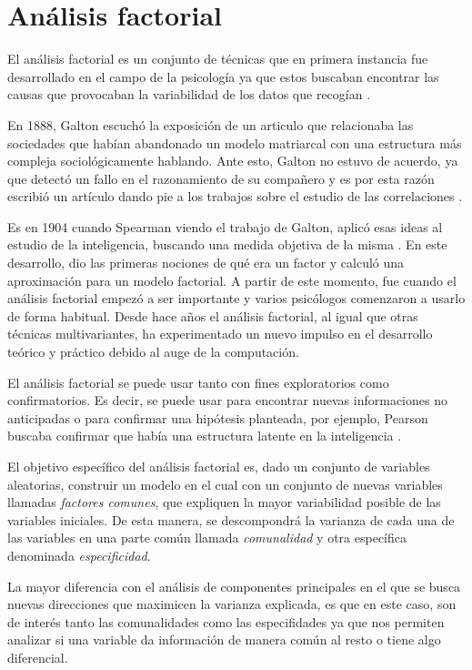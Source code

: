 \newpage
\section{Análisis factorial}

\noindent El análisis factorial es un conjunto de técnicas que en primera instancia fue desarrollado en el campo de la psicología ya que estos buscaban encontrar las causas que provocaban la variabilidad de los datos que recogían \cite{Vincent 1953}. 

\noindent En 1888, Galton escuchó la exposición de un articulo que relacionaba las sociedades que habían abandonado un modelo matriarcal con una estructura más compleja sociológicamente hablando. Ante esto, Galton no estuvo de acuerdo, ya que detectó un fallo en el razonamiento de su compañero y es por esta razón escribió un artículo  dando pie a los trabajos sobre el estudio de las correlaciones \cite{Galton 1889}.   

\noindent Es en 1904 cuando Spearman  viendo el trabajo de Galton, aplicó esas ideas al estudio de la inteligencia, buscando una medida objetiva de la misma \cite{Spearman 1904}. En este desarrollo, dio las primeras nociones de qué era un factor y calculó una aproximación para un modelo factorial. A partir de este momento, fue cuando el análisis factorial empezó a ser importante y varios psicólogos comenzaron a usarlo de forma habitual. 
Desde hace años el análisis factorial, al igual que otras técnicas multivariantes, ha experimentado un nuevo impulso en el desarrollo teórico y práctico debido al auge de la computación. 

\noindent El análisis factorial se puede usar tanto con fines exploratorios como confirmatorios. Es decir, se puede usar para encontrar nuevas informaciones no anticipadas o para confirmar una hipótesis planteada, por ejemplo, Pearson buscaba confirmar que había una estructura latente en la inteligencia \cite{Hair 1995}.

\noindent El objetivo específico del análisis factorial es, dado un conjunto de variables aleatorias, construir un modelo en el cual con un conjunto de nuevas variables llamadas \emph{factores comunes}, que expliquen la mayor variabilidad posible de las variables iniciales. De esta manera, se descompondrá la varianza de cada una de las variables en una parte común llamada \emph{comunalidad}  y otra específica denominada \emph{especificidad}. 

\noindent La mayor diferencia con el análisis de componentes principales en el que se busca nuevas direcciones que maximicen la varianza explicada, es que en este caso, son de interés tanto las comunalidades como las especifidades ya que nos permiten analizar si una variable da información de manera común al resto o tiene algo diferencial. 

